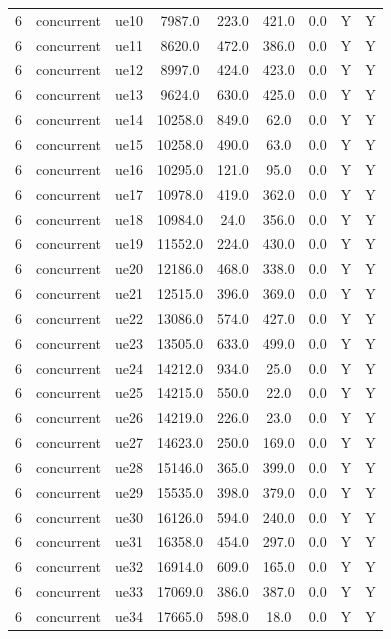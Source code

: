 \begin{table}[ht]
\begin{tabular}{|c|c|c|c|c|c|c|c|c|}
6 & concurrent & ue10 & 7987.0 & 223.0 & 421.0 & 0.0 & Y & Y \\
6 & concurrent & ue11 & 8620.0 & 472.0 & 386.0 & 0.0 & Y & Y \\
6 & concurrent & ue12 & 8997.0 & 424.0 & 423.0 & 0.0 & Y & Y \\
6 & concurrent & ue13 & 9624.0 & 630.0 & 425.0 & 0.0 & Y & Y \\
6 & concurrent & ue14 & 10258.0 & 849.0 & 62.0 & 0.0 & Y & Y \\
6 & concurrent & ue15 & 10258.0 & 490.0 & 63.0 & 0.0 & Y & Y \\
6 & concurrent & ue16 & 10295.0 & 121.0 & 95.0 & 0.0 & Y & Y \\
6 & concurrent & ue17 & 10978.0 & 419.0 & 362.0 & 0.0 & Y & Y \\
6 & concurrent & ue18 & 10984.0 & 24.0 & 356.0 & 0.0 & Y & Y \\
6 & concurrent & ue19 & 11552.0 & 224.0 & 430.0 & 0.0 & Y & Y \\
6 & concurrent & ue20 & 12186.0 & 468.0 & 338.0 & 0.0 & Y & Y \\
6 & concurrent & ue21 & 12515.0 & 396.0 & 369.0 & 0.0 & Y & Y \\
6 & concurrent & ue22 & 13086.0 & 574.0 & 427.0 & 0.0 & Y & Y \\
6 & concurrent & ue23 & 13505.0 & 633.0 & 499.0 & 0.0 & Y & Y \\
6 & concurrent & ue24 & 14212.0 & 934.0 & 25.0 & 0.0 & Y & Y \\
6 & concurrent & ue25 & 14215.0 & 550.0 & 22.0 & 0.0 & Y & Y \\
6 & concurrent & ue26 & 14219.0 & 226.0 & 23.0 & 0.0 & Y & Y \\
6 & concurrent & ue27 & 14623.0 & 250.0 & 169.0 & 0.0 & Y & Y \\
6 & concurrent & ue28 & 15146.0 & 365.0 & 399.0 & 0.0 & Y & Y \\
6 & concurrent & ue29 & 15535.0 & 398.0 & 379.0 & 0.0 & Y & Y \\
6 & concurrent & ue30 & 16126.0 & 594.0 & 240.0 & 0.0 & Y & Y \\
6 & concurrent & ue31 & 16358.0 & 454.0 & 297.0 & 0.0 & Y & Y \\
6 & concurrent & ue32 & 16914.0 & 609.0 & 165.0 & 0.0 & Y & Y \\
6 & concurrent & ue33 & 17069.0 & 386.0 & 387.0 & 0.0 & Y & Y \\
6 & concurrent & ue34 & 17665.0 & 598.0 & 18.0 & 0.0 & Y & Y \\

\end{tabular}
\end{table}
